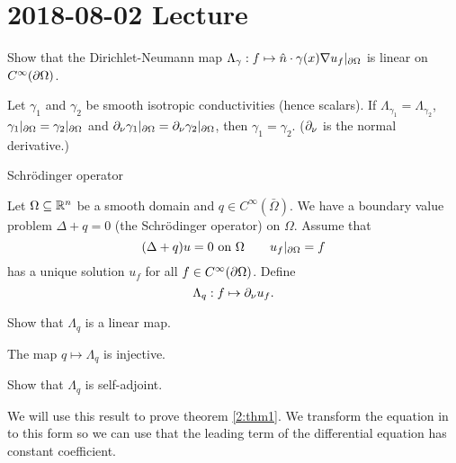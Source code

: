 \section{2018-08-02 Lecture}

\begin{exer}
Show that the Dirichlet-Neumann map $\Lambda_\gamma: f \mapsto \hat n \cdot \gamma(x) \nabla u_f|_{\partial\Omega}$ is linear on $C^\infty(\partial\Omega)$.
\end{exer}

\begin{thm}\label{2:thm1}
  Let $\gamma_1$ and $\gamma_2$ be smooth isotropic conductivities (hence scalars).
  If $\Lambda_{\gamma_1}=\Lambda_{\gamma_2}$, $\gamma_1|_{\partial\Omega}=\gamma_2|_{\partial\Omega}$ and $\partial_\nu\gamma_1|_{\partial\Omega}=\partial_\nu\gamma_2|_{\partial\Omega}$, then $\gamma_1=\gamma_2$.
  ($\partial_\nu$ is the normal derivative.)
\end{thm}

Schr\"odinger operator

\begin{defn}
  Let $\Omega \subseteq \mathbb{R}^n$ be a smooth domain and $q \in C^\infty(\bar\Omega)$.
  We have a boundary value problem $\Delta+q=0$ (the Schr\"odinger operator) on $\Omega$.
  Assume that
  \[ (\Delta+q)u=0 \text{ on } \Omega \qquad u_f|_{\partial\Omega}=f \]
  has a unique solution $u_f$ for all $f \in C^\infty(\partial\Omega)$.
  Define
  \[ \Lambda_q: f \mapsto \partial_\nu u_f. \]
\end{defn}

\begin{exer}
  Show that $\Lambda_q$ is a linear map.
\end{exer}

\begin{thm}\label{2:thm2}
  The map $q \mapsto \Lambda_q$ is injective.
\end{thm}

\begin{exer}
  Show that $\Lambda_q$ is self-adjoint.
\end{exer}

We will use this result to prove theorem \ref{2:thm1}.
We transform the equation in to this form so we can use that the leading term of the differential equation has constant coefficient.

